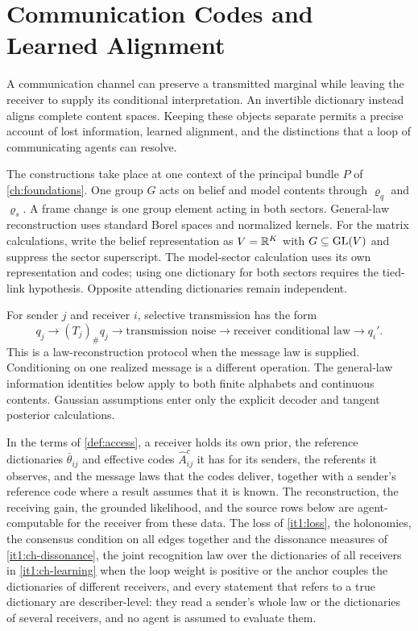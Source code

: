 \chapter{Communication Codes and Learned Alignment}
\label{ch:communication-links}

A communication channel can preserve a transmitted marginal while leaving the receiver to supply its conditional interpretation. An invertible dictionary instead aligns complete content spaces. Keeping these objects separate permits a precise account of lost information, learned alignment, and the distinctions that a loop of communicating agents can resolve.

The constructions take place at one context of the principal bundle $P$ of \cref{ch:foundations}. One group $G$ acts on belief and model contents through $\varrho_q$ and $\varrho_s$. A frame change is one group element acting in both sectors. General-law reconstruction uses standard Borel spaces and normalized kernels. For the matrix calculations, write the belief representation as $V=\mathbb R^K$ with $G\subseteq\mathrm{GL}(V)$ and suppress the sector superscript. The model-sector calculation uses its own representation and codes; using one dictionary for both sectors requires the tied-link hypothesis. Opposite attending dictionaries remain independent.

For sender $j$ and receiver $i$, selective transmission has the form
\begin{equation}
q_j\longrightarrow(T_j)_\#q_j
\longrightarrow\text{transmission noise}
\longrightarrow\text{receiver conditional law}
\longrightarrow q_i'.
\label{it1:chain}
\end{equation}
This is a law-reconstruction protocol when the message law is supplied. Conditioning on one realized message is a different operation. The general-law information identities below apply to both finite alphabets and continuous contents. Gaussian assumptions enter only the explicit decoder and tangent posterior calculations.

In the terms of \cref{def:access}, a receiver holds its own prior, the reference dictionaries $\bar\theta_{ij}$ and effective codes $\hat A_{ij}^c$ it has for its senders, the referents it observes, and the message laws that the codes deliver, together with a sender's reference code where a result assumes that it is known. The reconstruction, the receiving gain, the grounded likelihood, and the source rows below are agent-computable for the receiver from these data. The loss of \cref{it1:loss}, the holonomies, the consensus condition on all edges together and the dissonance measures of \cref{it1:ch-dissonance}, the joint recognition law over the dictionaries of all receivers in \cref{it1:ch-learning} when the loop weight is positive or the anchor couples the dictionaries of different receivers, and every statement that refers to a true dictionary are describer-level: they read a sender's whole law or the dictionaries of several receivers, and no agent is assumed to evaluate them.

